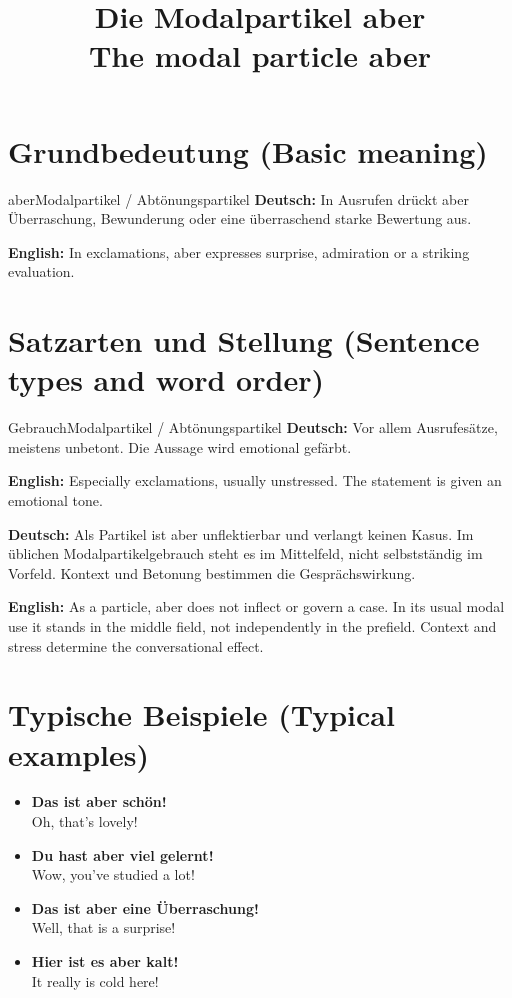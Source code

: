 \documentclass[a4paper,11pt]{article}
\title{Die Modalpartikel \glqq aber\grqq\\{\large\textnormal{The modal particle aber}}}
\date{}
\newcommand{\GermanText}[1]{\textbf{Deutsch: }#1\par}
\newcommand{\EnglishText}[1]{{\small\color{SoftGray}\textbf{English: }#1\par}}
\newcommand{\ExampleItem}[2]{\item \textbf{#1}\\{\small\color{SoftGray}#2}}
\begin{document}
\maketitle
\tableofcontents
\section{Grundbedeutung \textnormal{(Basic meaning)}}
\begin{grammarentry}{aber}{Modalpartikel / Abtönungspartikel}
\GermanText{In Ausrufen drückt aber Überraschung, Bewunderung oder eine überraschend starke Bewertung aus.}
\EnglishText{In exclamations, aber expresses surprise, admiration or a striking evaluation.}
\end{grammarentry}
\section{Satzarten und Stellung \textnormal{(Sentence types and word order)}}
\begin{grammarentry}{Gebrauch}{Modalpartikel / Abtönungspartikel}
\GermanText{Vor allem Ausrufesätze, meistens unbetont. Die Aussage wird emotional gefärbt.}
\EnglishText{Especially exclamations, usually unstressed. The statement is given an emotional tone.}
\end{grammarentry}
\GermanText{Als Partikel ist aber unflektierbar und verlangt keinen Kasus. Im üblichen Modalpartikelgebrauch steht es im Mittelfeld, nicht selbstständig im Vorfeld. Kontext und Betonung bestimmen die Gesprächswirkung.}
\EnglishText{As a particle, aber does not inflect or govern a case. In its usual modal use it stands in the middle field, not independently in the prefield. Context and stress determine the conversational effect.}
\section{Typische Beispiele \textnormal{(Typical examples)}}
\begin{exbox}\begin{itemize}
\ExampleItem{Das ist aber schön!}{Oh, that's lovely!}
\ExampleItem{Du hast aber viel gelernt!}{Wow, you've studied a lot!}
\ExampleItem{Das ist aber eine Überraschung!}{Well, that is a surprise!}
\ExampleItem{Hier ist es aber kalt!}{It really is cold here!}
\end{itemize}\end{exbox}
\end{document}

